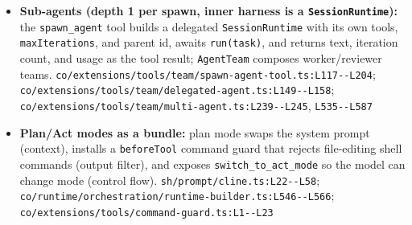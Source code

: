 \begin{itemize}
\item \textbf{Sub-agents (depth 1 per spawn, inner harness is a \texttt{SessionRuntime}):} the \texttt{spawn\_\allowbreak{}agent} tool builds a delegated \texttt{SessionRuntime} with its own tools, \texttt{maxIterations}, and parent id, awaits \texttt{run(\allowbreak{}task)}, and returns text, iteration count, and usage as the tool result; \texttt{AgentTeam} composes worker/reviewer teams. \texttt{co/\allowbreak{}extensions/\allowbreak{}tools/\allowbreak{}team/\allowbreak{}spawn-\allowbreak{}agent-\allowbreak{}tool.\allowbreak{}ts:\allowbreak{}L117-\allowbreak{}-\allowbreak{}L204}; \texttt{co/\allowbreak{}extensions/\allowbreak{}tools/\allowbreak{}team/\allowbreak{}delegated-\allowbreak{}agent.\allowbreak{}ts:\allowbreak{}L149-\allowbreak{}-\allowbreak{}L158}; \texttt{co/\allowbreak{}extensions/\allowbreak{}tools/\allowbreak{}team/\allowbreak{}multi-\allowbreak{}agent.\allowbreak{}ts:\allowbreak{}L239-\allowbreak{}-\allowbreak{}L245}, \texttt{L535-\allowbreak{}-\allowbreak{}L587}
\item \textbf{Plan/Act modes as a bundle:} plan mode swaps the system prompt (context), installs a \texttt{beforeTool} command guard that rejects file-editing shell commands (output filter), and exposes \texttt{switch\_\allowbreak{}to\_\allowbreak{}act\_\allowbreak{}mode} so the model can change mode (control flow). \texttt{sh/\allowbreak{}prompt/\allowbreak{}cline.\allowbreak{}ts:\allowbreak{}L22-\allowbreak{}-\allowbreak{}L58}; \texttt{co/\allowbreak{}runtime/\allowbreak{}orchestration/\allowbreak{}runtime-\allowbreak{}builder.\allowbreak{}ts:\allowbreak{}L546-\allowbreak{}-\allowbreak{}L566}; \texttt{co/\allowbreak{}extensions/\allowbreak{}tools/\allowbreak{}command-\allowbreak{}guard.\allowbreak{}ts:\allowbreak{}L1-\allowbreak{}-\allowbreak{}L23}
\end{itemize}

